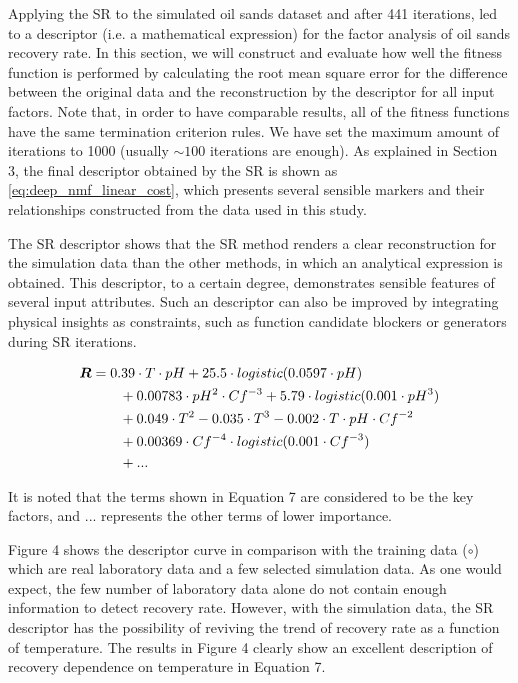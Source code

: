 \documentclass[10pt,journal,compsoc]{IEEEtran}
\begin{document}
Applying the SR to the simulated oil sands dataset and after 441 iterations,  led to a descriptor (i.e. a mathematical expression) for the factor analysis of oil sands recovery rate. 
In this section, we will construct and evaluate how well the fitness function is performed by calculating the root mean square error for the difference between the original data and the reconstruction by the descriptor for all input factors. Note that, in order to have comparable results, all of the fitness functions have the same termination criterion rules. We have set the maximum amount of iterations to 1000 (usually ${\sim}100$
iterations are enough). As explained in Section 3, the final descriptor obtained by the SR is shown as \autoref{eq:deep_nmf_linear_cost}, which presents several sensible markers and their relationships constructed from the data used in this study. 

The SR descriptor shows that the SR method renders a clear reconstruction for the simulation data than the other methods, in which an analytical expression is obtained. This descriptor, to a certain degree, demonstrates sensible features of several input attributes. Such an descriptor can also be improved by integrating physical insights as constraints, such as function candidate blockers or generators during SR iterations. 


\begin{align} \label{eq:deep_nmf_linear_cost}
\notag  \bs R &= 0.39\cdot T \cdot pH + 25.5\cdot logistic(0.0597 \cdot pH)\\\notag 
&\qquad + 0.00783 \cdot pH^2 \cdot Cf^{-3} + 5.79 \cdot logistic(0.001 \cdot pH^3)\\\notag 
&\qquad +0.049 \cdot T^2 -0.035 \cdot T^3-0.002\cdot T \cdot pH \cdot Cf^{-2}\\\notag 
&\qquad + 0.00369 \cdot Cf^{-4} \cdot logistic(0.001 \cdot Cf^{-3})\\\notag
&\qquad +...\\
\end{align}

It is noted that the terms shown in Equation 7 are considered to be the key factors, and ... represents the other terms of lower importance. 

Figure 4 shows the descriptor curve in comparison with the training data ($\circ$) which are real laboratory data and a few selected simulation data. As one would expect, the few number of laboratory data alone do not contain enough information to detect recovery rate.
However, with the simulation data, the SR descriptor
has the possibility of reviving the trend of recovery rate as a function of temperature. The results in Figure 4 clearly show an excellent description of recovery dependence on temperature in Equation 7.
\end{document}

